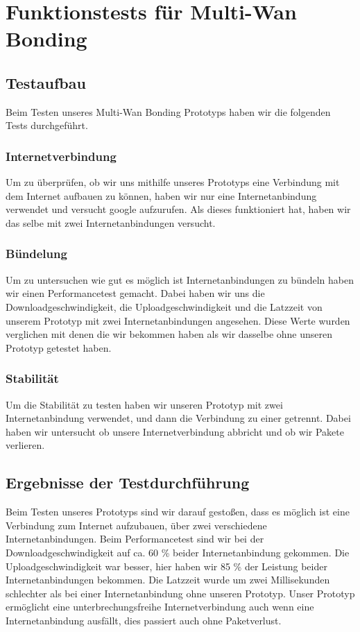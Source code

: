 \chapter{Funktionstests für Multi-Wan Bonding}
\label{cha:Funktionstests für Multi-Wan Bonding}

\section{Testaufbau}
Beim Testen unseres Multi-Wan Bonding Prototyps haben wir die folgenden Tests durchgeführt. 

\subsection{Internetverbindung}
Um zu überprüfen, ob wir uns mithilfe unseres Prototyps eine Verbindung mit dem Internet aufbauen zu können, haben wir nur eine Internetanbindung verwendet und versucht google aufzurufen. Als dieses funktioniert hat, haben wir das selbe mit zwei Internetanbindungen versucht.

\subsection{Bündelung}
Um zu untersuchen wie gut es möglich ist Internetanbindungen zu bündeln haben wir einen Performancetest gemacht. Dabei haben wir uns die Downloadgeschwindigkeit, die Uploadgeschwindigkeit und die Latzzeit von unserem Prototyp mit zwei Internetanbindungen angesehen. Diese Werte wurden verglichen mit denen die wir bekommen haben als wir dasselbe ohne unseren Prototyp getestet haben. 

\subsection{Stabilität}
Um die Stabilität zu testen haben wir unseren Prototyp mit zwei Internetanbindung verwendet, und dann die Verbindung zu einer getrennt. Dabei haben wir untersucht ob unsere Internetverbindung abbricht und ob wir Pakete verlieren. 

\newpage

\section{Ergebnisse der Testdurchführung}
Beim Testen unseres Prototyps sind wir darauf gestoßen, dass es möglich ist eine Verbindung zum Internet aufzubauen, über zwei verschiedene Internetanbindungen. Beim Performancetest sind wir bei der Downloadgeschwindigkeit auf ca. 60 \% beider Internetanbindung gekommen. Die Uploadgeschwindigkeit war besser, hier haben wir 85 \% der Leistung beider Internetanbindungen bekommen. Die Latzzeit wurde um zwei Millisekunden schlechter als bei einer Internetanbindung ohne unseren Prototyp. Unser Prototyp ermöglicht eine unterbrechungsfreihe Internetverbindung auch wenn eine Internetanbindung ausfällt, dies passiert auch ohne Paketverlust.